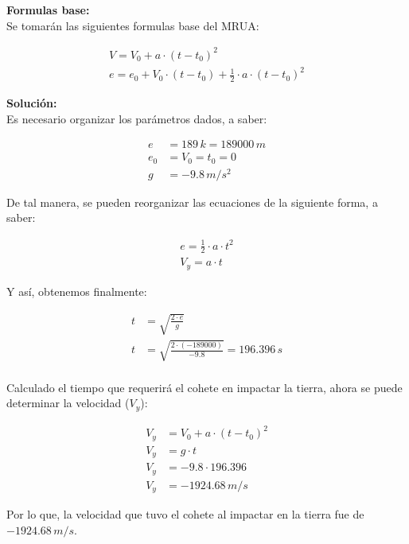 \documentclass[11pt,letterpaper]{article}
\begin{document}
\textbf{Formulas base:}\\

Se tomarán las siguientes formulas base del MRUA:

\begin{align}
\boxed{ V = V_{0} + a \cdot (t - t_{0})^2}\\
\boxed{ e = e_{0} + V_{0} \cdot (t - t_{0}) + \frac{1}{2} \cdot a \cdot (t - t_{0})^2 }
\end{align}

\textbf{Solución:}\\

Es necesario organizar los parámetros dados, a saber:

\begin{align*}
e &= 189\,k = 189000\,m\\
e_{0} &= V_{0} = t_{0} = 0\\
g &= -9.8\,m/s^2
\end{align*}

De tal manera, se pueden reorganizar las ecuaciones de la siguiente forma, a saber:

\begin{align}
\boxed{ e = \frac{1}{2} \cdot a \cdot t^2 }\\
\boxed{ V_{y} = a \cdot t}	
\end{align}

Y así, obtenemos finalmente:

\begin{align*}
t &= \sqrt{\frac{2 \cdot e}{g}}\\
t &= \sqrt{\frac{2 \cdot (-189000)}{ -9.8}} = 196.396\,s\\
\end{align*}

Calculado el tiempo que requerirá el cohete en impactar la tierra, ahora se puede determinar la velocidad ($V_{y}$):

\begin{align*}
V_{y} &= V_{0} + a \cdot (t - t_{0})^2\\
V_{y} &= g \cdot t\\
V_{y} &= -9.8 \cdot 196.396\\
V_{y} &= -1924.68\,m/s
\end{align*}

Por lo que, la velocidad que tuvo el cohete al impactar en la tierra fue de $-1924.68\,m/s$.

\end{document}

